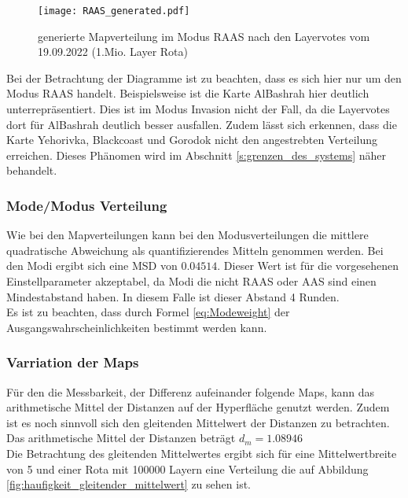             \begin{figure}[htbp]
                \centering
                \texttt{[image: RAAS\_generated.pdf]}
                \caption{generierte Mapverteilung im Modus RAAS nach den Layervotes vom 19.09.2022 (1.Mio. Layer Rota)}
                \label{fig:generated_mapverteilung_raas}
            \end{figure}

            Bei der Betrachtung der Diagramme 
            ist zu beachten, dass es sich hier nur um den Modus RAAS handelt.
            Beispielsweise ist die Karte AlBashrah hier deutlich unterrepräsentiert. Dies ist im Modus Invasion
            nicht der Fall, da die Layervotes dort für AlBashrah deutlich besser ausfallen.
            Zudem lässt sich erkennen, dass die Karte Yehorivka, Blackcoast und Gorodok nicht den angestrebten
            Verteilung erreichen. Dieses Phänomen wird im Abschnitt \ref{s:grenzen_des_systems} näher behandelt.

        \subsubsection{Mode/Modus Verteilung}
            Wie bei den Mapverteilungen kann bei den Modusverteilungen die mittlere quadratische Abweichung als
            quantifizierendes Mitteln genommen werden. Bei den Modi ergibt sich eine MSD von $0.04514$.
            Dieser Wert ist für die vorgesehenen Einstellparameter akzeptabel, da Modi die nicht RAAS oder AAS sind
            einen Mindestabstand haben. In diesem Falle ist dieser Abstand 4 Runden.\\
            Es ist zu beachten, dass durch Formel \ref{eq:Modeweight} der Ausgangswahrscheinlichkeiten bestimmt werden kann.
        \subsubsection{Varriation der Maps}
            Für den die Messbarkeit, der Differenz aufeinander folgende Maps, kann das arithmetische Mittel der Distanzen
            auf der Hyperfläche genutzt werden. Zudem ist es noch sinnvoll sich den gleitenden Mittelwert der Distanzen
            zu betrachten.\\
            Das arithmetische Mittel der Distanzen beträgt $d_m = 1.08946$\\
            Die Betrachtung des gleitenden Mittelwertes ergibt sich für eine Mittelwertbreite von 5 und einer Rota mit 100000 Layern
            eine Verteilung die auf Abbildung \ref{fig:haufigkeit_gleitender_mittelwert} zu sehen ist.
            
